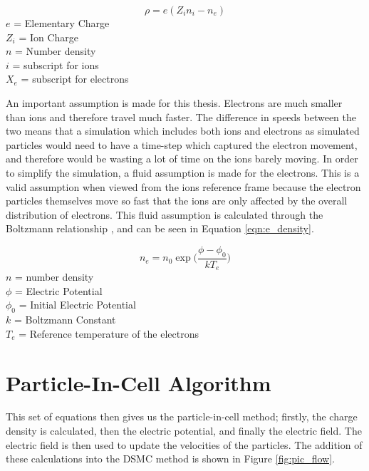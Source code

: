 \begin{equation}
    \label{eqn:density}
    \rho = e(Z_i n_i - n_e)
\end{equation}
\(e\) = Elementary Charge \\
\(Z_i\) = Ion Charge \\
\(n\) = Number density \\
\(i\) = subscript for ions \\
\(X_e\) = subscript for electrons \par

An important assumption is made for this thesis. Electrons are much smaller than ions and therefore travel much faster. The difference in speeds between the two means that a simulation which includes both ions and electrons as simulated particles would need to have a time-step which captured the electron movement, and therefore would be wasting a lot of time on the ions barely moving. In order to simplify the simulation, a fluid assumption is made for the electrons. This is a valid assumption when viewed from the ions reference frame because the electron particles themselves move so fast that the ions are only affected by the overall distribution of electrons. This fluid assumption is calculated through the Boltzmann relationship \cite{es-pic}, and can be seen in Equation \ref{eqn:e_density}.


\begin{equation}
    \label{eqn:e_density}
    n_e = n_0 \exp\Big(\frac{\phi - \phi_0}{k T_e}\Big)
\end{equation}
\(n\) = number density \\
\(\phi\) = Electric Potential \\
\(\phi_0\) = Initial Electric Potential \\
\(k\) = Boltzmann Constant \\
\(T_e\) = Reference temperature of the electrons \par



\section{Particle-In-Cell Algorithm}
\label{sec:algorithm}





This set of equations then gives us the particle-in-cell method; firstly, the charge density is calculated, then the electric potential, and finally the electric field. The electric field is then used to update the velocities of the particles. The addition of these calculations into the DSMC method is shown in Figure \ref{fig:pic_flow}.

